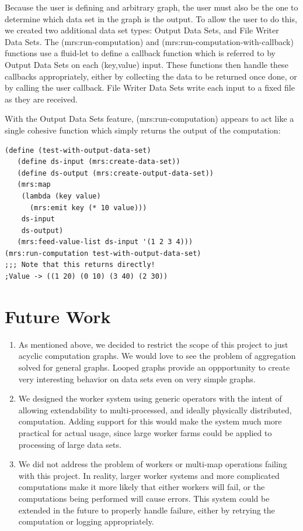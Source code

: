 \documentclass{article}
\begin{document}
Because the user is defining and arbitrary graph, the user must also be the one
to determine which data set in the graph is the output. To allow the user to do
this, we created two additional data set types: Output Data Sets, and File Writer Data Sets.
The (mrs:run-computation) and (mrs:run-computation-with-callback) functions use
a fluid-let to define a callback function which is referred to by Output Data Sets
on each (key,value) input. These functions then handle these callbacks appropriately,
either by collecting the data to be returned once done, or by calling the user
callback. File Writer Data Sets write each input to a fixed file as they are received.

With the Output Data Sets feature, (mrs:run-computation) appears to act like a
single cohesive function which simply returns the output of the computation:

\begin{verbatim}
(define (test-with-output-data-set)               
   (define ds-input (mrs:create-data-set))        
   (define ds-output (mrs:create-output-data-set))
   (mrs:map                                       
    (lambda (key value)                           
      (mrs:emit key (* 10 value)))                
    ds-input                                      
    ds-output)                                    
   (mrs:feed-value-list ds-input '(1 2 3 4)))     
(mrs:run-computation test-with-output-data-set)  
;;; Note that this returns directly!              
;Value -> ((1 20) (0 10) (3 40) (2 30))
\end{verbatim}           


\section{Future Work}

\begin{enumerate}
\item As mentioned above, we decided to restrict the scope of this project to just
  acyclic computation graphs. We would love to see the problem of aggregation
  solved for general graphs. Looped graphs provide an oppportunity to create
  very interesting behavior on data sets even on very simple graphs.
\item We designed the worker system using generic operators with the intent of
  allowing extendability to multi-processed, and ideally physically distributed,
  computation. Adding support for this would make the system much more practical
  for actual usage, since large worker farms could be applied to processing of
  large data sets.
\item We did not address the problem of workers or multi-map operations failing
  with this project. In reality, larger worker systems and more complicated
  computations make it more likely that either workers will fail, or the computations
  being performed will cause errors. This system could be extended in the future
  to properly handle failure, either by retrying the computation or logging
  appropriately.
\end{enumerate}
\end{document}

